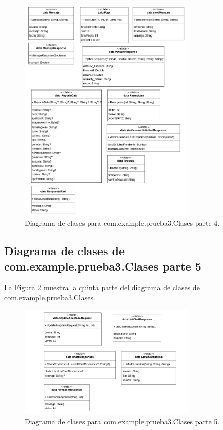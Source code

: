 \begin{figure}[htbp!]
	\begin{center}
		\includegraphics[width=0.75\textwidth]{DiagramasMoviles/DCM (5)}
		\caption{Diagrama de clases para com.example.prueba3.Clases parte 4.}
		\label{fig:Clases4}
	\end{center}
\end{figure}

\newpage

\subsection{Diagrama de clases de com.example.prueba3.Clases parte 5}

La Figura \ref{fig:Clases5} muestra la quinta parte del diagrama de clases de com.example.prueba3.Clases.

\begin{figure}[htbp!]
	\begin{center}
		\includegraphics[width=0.75\textwidth]{DiagramasMoviles/DCM (6)}
		\caption{Diagrama de clases para com.example.prueba3.Clases parte 5.}
		\label{fig:Clases5}
	\end{center}
\end{figure}

